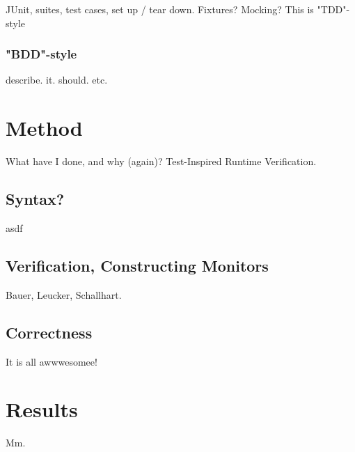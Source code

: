 \documentclass[a4paper,11pt]{kth-mag}
\begin{document}
JUnit, suites, test cases, set up / tear down. Fixtures? Mocking? This is
"TDD"-style

\subsection{"BDD"-style}

describe. it. should. etc.







\pagestyle{newchap}
\chapter{Method} \label{chapter-method}

What have I done, and why (again)? Test-Inspired Runtime Verification.


\section{Syntax?}

asdf

\section{Verification, Constructing Monitors}

Bauer, Leucker, Schallhart.

\section{Correctness}

It is all awwwesomee!





\pagestyle{newchap}
\chapter{Results} \label{chapter-results}

Mm.




\end{document}
